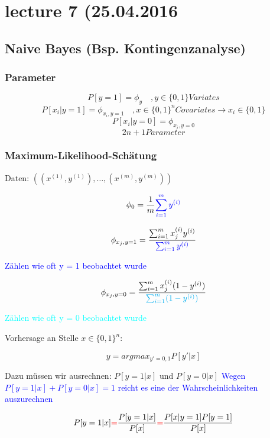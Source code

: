 \newcommand{\xj}[1]{\phi_{x_j, y=#1}}

\section*{lecture 7 (25.04.2016}
\subsection{Naive Bayes (Bsp. Kontingenzanalyse)}
	\subsubsection*{Parameter}
		\[ P[y=1] = \phi_y \quad, y \in \{0,1\} Variates\]
		\[ P[x_i|y=1] = \phi_{x_i, y = 1} \quad, x \in \{0,1\}^n Covariates  \rightarrow x_i \in \{0,1\}\]
		\[ P[x_i|y=0] = \phi_{x_i, y = 0}\]
		\[2n + 1 Parameter \]
	
	\subsubsection*{Maximum-Likelihood-Schätung}
	
		Daten: $ ((x^{(1)},y^{(1)}),\dots,(x^{(m)},y^{(m)}) ) $
		
		\[ \phi_0 = \frac{1}{m} \textcolor{blue}{\sum_{i = 1}^{m} y^{(i)}}\]
		
		\[ \xj{1} = \frac{\sum_{i=1}^{m} x_j ^{(i)} y^{(i)}}{\textcolor{blue}{\sum_{i=1}^{m}y^{(i)}}} \]
			
			\textcolor{blue}{Zählen wie oft y = 1 beobachtet wurde}
			
		\[ \xj{0} =  \frac{\sum_{i=1}^{m} x_j ^{(i)} (1- y^{(i)})}{\textcolor{cyan}{\sum_{i=1}^{m}(1- y^{(i)})}} \]
		
			\textcolor{cyan}{Zählen wie oft y = 0 beobachtet wurde}
			
		Vorhersage an Stelle $ x \in \{0,1\}^n $:
		
		\begin{framed}
			\[ y = argmax_{y' = 0,1} P[y'|x] \]
		\end{framed}
		
		Dazu müssen wir ausrechnen: $ P[y = 1|x] $ und $ P[y = 0|x] $
		\textcolor{blue}{Wegen $ P[y = 1|x] + P[y = 0|x] = 1$ reicht es eine der Wahrscheinlichkeiten auszurechnen} 
		
		\[ P[y = 1|x] \textcolor{red}{=} \frac{P[y = 1|x]}{P[x]} \textcolor{red}{=} \frac{P[x| y = 1]P[y = 1]}{P[x]} \]
		
